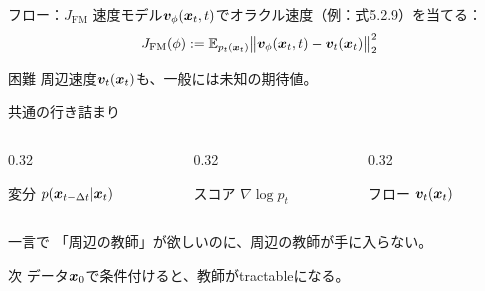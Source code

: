 \asmain
\begin{frame}{フロー：$J_{\mathrm{FM}}$}
    速度モデル$\bm{v}_\phi(\bm{x}_t,t)$でオラクル速度（例：式5.2.9）を当てる：
    \[
        J_{\mathrm{FM}}(\phi)
        :=
        \mathbb{E}_{p_t(\bm{x}_t)}
        \bigl\|
        \bm{v}_\phi(\bm{x}_t,t)
        -
        \bm{v}_t(\bm{x}_t)
        \bigr\|_{2}^{2}
    \]
    \begin{block}{困難}
        周辺速度$\bm{v}_t(\bm{x}_t)$も、一般には未知の期待値。
    \end{block}
\end{frame}
\asmain
\begin{frame}{共通の行き詰まり}
    \begin{columns}[T,onlytextwidth]
        \begin{column}{0.32\textwidth}
            \begin{block}{変分}
                $p(\bm{x}_{t-\Delta t}|\bm{x}_t)$
            \end{block}
        \end{column}
        \begin{column}{0.32\textwidth}
            \begin{block}{スコア}
                $\nabla\log p_t$
            \end{block}
        \end{column}
        \begin{column}{0.32\textwidth}
            \begin{block}{フロー}
                $\bm{v}_t(\bm{x}_t)$
            \end{block}
        \end{column}
    \end{columns}
    \vspace{0.6em}
    \begin{alertblock}{一言で}
        「周辺の教師」が欲しいのに、周辺の教師が手に入らない。
    \end{alertblock}
    \begin{block}{次}
        データ$\bm{x}_0$で条件付けると、教師がtractableになる。
    \end{block}
\end{frame}
